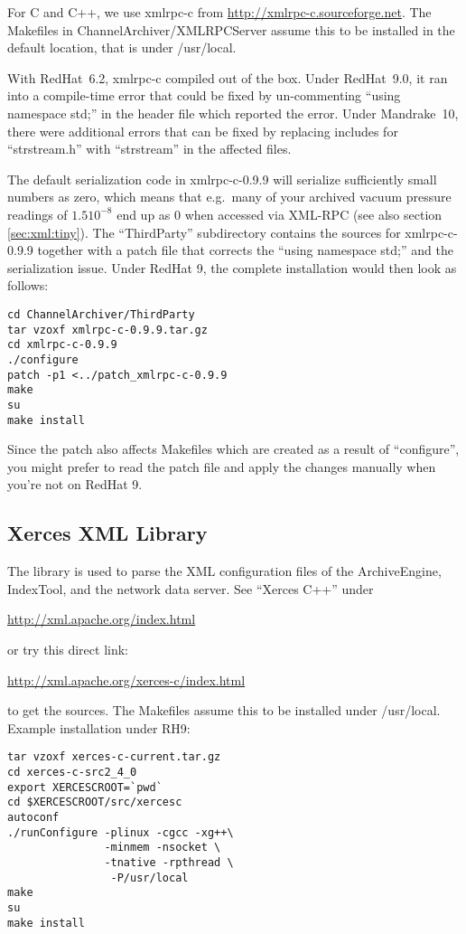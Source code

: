 For C and C++, we use xmlrpc-c from
\href{http://xmlrpc-c.sourceforge.net}{http://xmlrpc-c.sourceforge.net}.
The Makefiles in ChannelArchiver/XMLRPCServer assume this to be
installed in the default location, that is under /usr/local.

With RedHat~6.2, xmlrpc-c compiled out of the box.
Under RedHat~9.0, it ran into a compile-time error that could be fixed
by un-commenting ``using namespace std;'' in the header file which
reported the error.
Under Mandrake~10, there were additional errors that can be fixed
by replacing includes for ``strstream.h'' with ``strstream'' in the affected files.

\NOTE The default serialization code in xmlrpc-c-0.9.9 will serialize
sufficiently small numbers as zero, which means that e.g.\ many of
your archived vacuum pressure readings of $1.5 10^{-8}$ end up as $0$
when accessed via XML-RPC (see also section \ref{sec:xml:tiny}).
The ``ThirdParty'' subdirectory contains the sources for xmlrpc-c-0.9.9
together with a patch file that corrects the ``using namespace std;'' and
the serialization issue. Under RedHat 9, the complete installation would
then look as follows:

\begin{lstlisting}[keywordstyle=\sffamily]
cd ChannelArchiver/ThirdParty
tar vzoxf xmlrpc-c-0.9.9.tar.gz
cd xmlrpc-c-0.9.9
./configure
patch -p1 <../patch_xmlrpc-c-0.9.9
make
su
make install
\end{lstlisting}

\noindent Since the patch also affects Makefiles which are created as a result
of ``configure'', you might prefer to read the patch file and apply
the changes manually when you're not on RedHat 9.

\subsection{Xerces XML Library}
The  library is used to parse the XML configuration files of the
ArchiveEngine, IndexTool, and the network data server.
See ``Xerces C++'' under
\begin{center}
\href{http://xml.apache.org/index.html}{http://xml.apache.org/index.html}
\end{center}
or try this direct link:
\begin{center}
\href{http://xml.apache.org/xerces-c/index.html}
     {http://xml.apache.org/xerces-c/index.html}
\end{center}
to get the sources. The Makefiles assume this to be installed under /usr/local.
Example installation under RH9:
\begin{lstlisting}[keywordstyle=\sffamily]
tar vzoxf xerces-c-current.tar.gz 
cd xerces-c-src2_4_0
export XERCESCROOT=`pwd`
cd $XERCESCROOT/src/xercesc
autoconf
./runConfigure -plinux -cgcc -xg++\
               -minmem -nsocket \
               -tnative -rpthread \
                -P/usr/local
make
su
make install
\end{lstlisting}

